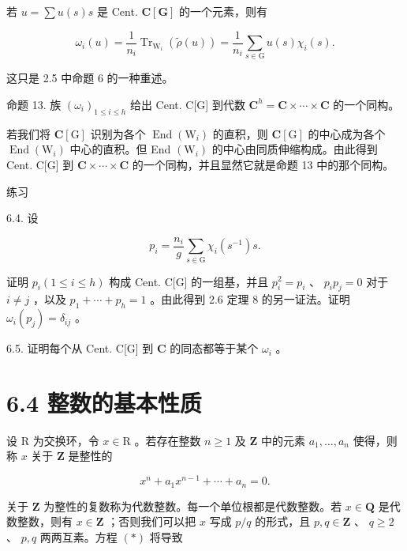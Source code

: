 \documentclass[10pt]{article}
\begin{document}
若 \(u = \sum u\left( s\right) s\) 是 Cent. \(\mathbf{C}\left\lbrack  \mathbf{G}\right\rbrack\) 的一个元素，则有

\[
{\omega }_{i}\left( u\right)  = \frac{1}{{n}_{i}}{\operatorname{Tr}}_{{\mathrm{W}}_{i}}\left( {\widetilde{\rho }\left( u\right) }\right)  = \frac{1}{{n}_{i}}\mathop{\sum }\limits_{{s \in  \mathrm{G}}}u\left( s\right) {\chi }_{i}\left( s\right) .
\]

这只是 2.5 中命题 6 的一种重述。

命题 13. 族 \({\left( {\omega }_{i}\right) }_{1 \leq  i \leq  h}\) 给出 Cent. C[G] 到代数 \({\mathbf{C}}^{h} = \mathbf{C} \times  \cdots  \times  \mathbf{C}\) 的一个同构。

若我们将 \(\mathbf{C}\left\lbrack  \mathrm{G}\right\rbrack\) 识别为各个 \(\operatorname{End}\left( {\mathrm{W}}_{i}\right)\) 的直积，则 \(\mathbf{C}\left\lbrack  \mathrm{G}\right\rbrack\) 的中心成为各个 \(\operatorname{End}\left( {\mathrm{W}}_{i}\right)\) 中心的直积。但 End \(\left( {\mathrm{W}}_{i}\right)\) 的中心由同质伸缩构成。由此得到 Cent. C[G] 到 \(\mathbf{C} \times  \cdots  \times  \mathbf{C}\) 的一个同构，并且显然它就是命题 13 中的那个同构。

练习

6.4. 设

\[
{p}_{i} = \frac{{n}_{i}}{g}\mathop{\sum }\limits_{{s \in  \mathrm{G}}}{\chi }_{i}\left( {s}^{-1}\right) s.
\]

证明 \({p}_{i}\left( {1 \leq  i \leq  h}\right)\) 构成 Cent. C[G] 的一组基，并且 \({p}_{i}^{2} = {p}_{i}\) 、 \({p}_{i}{p}_{j} = 0\) 对于 \(i \neq  j\) ，以及 \({p}_{1} + \cdots  + {p}_{h} = 1\) 。由此得到 2.6 定理 8 的另一证法。证明 \({\omega }_{i}\left( {p}_{j}\right)  = {\delta }_{ij}\) 。

6.5. 证明每个从 Cent. C[G] 到 \(\mathbf{C}\) 的同态都等于某个 \({\omega }_{i}\) 。

\section*{6.4 整数的基本性质}

设 \(\mathrm{R}\) 为交换环，令 \(x \in  \mathrm{R}\) 。若存在整数 \(n \geq  1\) 及 \(\mathbf{Z}\) 中的元素 \({a}_{1},\ldots ,{a}_{n}\) 使得，则称 \(x\) 关于 \(\mathbf{Z}\) 是整性的

\[
{x}^{n} + {a}_{1}{x}^{n - 1} + \cdots  + {a}_{n} = 0.
\]

关于 \(\mathbf{Z}\) 为整性的复数称为代数整数。每一个单位根都是代数整数。若 \(x \in  \mathbf{Q}\) 是代数整数，则有 \(x \in  \mathbf{Z}\) ；否则我们可以把 \(x\) 写成 \(p/q\) 的形式，且 \(p,q \in  \mathbf{Z}\) 、 \(q \geq  2\) 、 \(p,q\) 两两互素。方程 \(\left( *\right)\) 将导致
\end{document}
